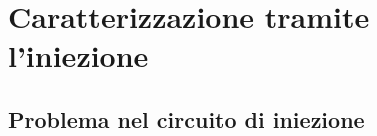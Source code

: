 \documentclass[10pt,a4paper,twoside]{report}
\begin{document}
\section{Caratterizzazione tramite l'iniezione}

\begin{comment}
Nel prototipo sotto studio, il chip W14R12, si sono rilevate fin da subito alcune problematiche legate ai pixel della matrice, sia per quel che riguarda la parte analogica che quella digitale.
In particolare, a differenza del suo predecessore TJ-Monopix1, TJ-Monopix2 è equipaggiato da un circuito che permette il \textit{tuning della threshold}, ossia di correggere, anche se di pochi DAC, la threshold di ciascun pixel, in modo da avere una threshold globale più uniforme possibile, o comunque con una dispersione piccola quanto possibile.

Preliminarmente però, è necessario studiare la distribuzione della threshold su tutta la matrice e noi abbiamo analizzato separatamente i 4 flavor, per poter anche studiare le loro principali differenze di funzionamento e performance.

Il fine ultimo di questa misura, è anche quello di riuscire a caratterizzare il comportamento di ciascun pixel, ad una carica iniettata equivalente all'energia tipica rilasciata dagli elettroni emessi dal decadimento di materiali radioattivi, e in particolare quelli dovuti alla cattura elettronica nel \ch{^55Fe}, le cui linee di emissione sono abbastanza piccate da permettere poi di confrontare i dati più facilmente. Come spiegato meglio nel paragrafo (?????), il \ch{^55Fe} ha una prima linea di emissione a  5.9 KeV che corrisponde in media all'incirca a 1616 $e^{-}$ generati (nel pixel?). Per questa ragione, nelle misure di iniezione è necessario, in base ai valori di conversione tra DAC ed $e^{-}$ SCRIVI, arrivare ad iniettare cariche in modo da studiare il comportamento dei pixel in queste regioni maggiormente interessanti. 
\end{comment}

\subsection{Problema nel circuito di iniezione}
\end{document}
